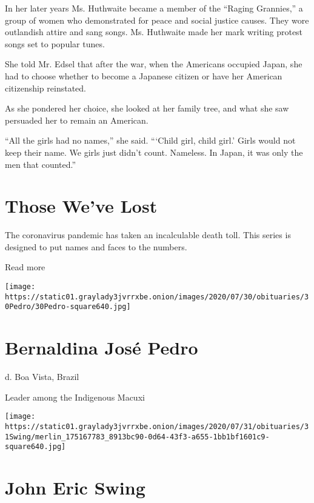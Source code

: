 In her later years Ms. Huthwaite became a member of the ``Raging
Grannies,'' a group of women who demonstrated for peace and social
justice causes. They wore outlandish attire and sang songs. Ms.
Huthwaite made her mark writing protest songs set to popular tunes.

She told Mr. Edsel that after the war, when the Americans occupied
Japan, she had to choose whether to become a Japanese citizen or have
her American citizenship reinstated.

As she pondered her choice, she looked at her family tree, and what she
saw persuaded her to remain an American.

``All the girls had no names,'' she said. ```Child girl, child girl.'
Girls would not keep their name. We girls just didn't count. Nameless.
In Japan, it was only the men that counted.''

\href{https://www.nytimes3xbfgragh.onion/interactive/2020/obituaries/people-died-coronavirus-obituaries.html?action=click\&pgtype=Article\&state=default\&region=BELOW_MAIN_CONTENT\&context=covid_obits_promo}{}

\hypertarget{those-weve-lost}{%
\section{Those We've Lost}\label{those-weve-lost}}

The coronavirus pandemic has taken an incalculable death toll. This
series is designed to put names and faces to the numbers.

Read more

\texttt{[image: https://static01.graylady3jvrrxbe.onion/images/2020/07/30/obituaries/30Pedro/30Pedro-square640.jpg]}

\hypertarget{bernaldina-josuxe9-pedro}{%
\section{Bernaldina José Pedro}\label{bernaldina-josuxe9-pedro}}

d. Boa Vista, Brazil

Leader among the Indigenous Macuxi

\texttt{[image: https://static01.graylady3jvrrxbe.onion/images/2020/07/31/obituaries/31Swing/merlin\_175167783\_8913bc90-0d64-43f3-a655-1bb1bf1601c9-square640.jpg]}

\hypertarget{john-eric-swing}{%
\section{John Eric Swing}\label{john-eric-swing}}

